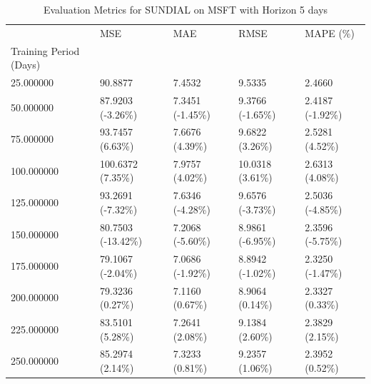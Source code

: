 \begin{table}
\caption{Evaluation Metrics for SUNDIAL on MSFT with Horizon 5 days}
\label{tab:sundial_MSFT_h5_metrics}
\begin{tabular}{lllll}
\toprule
 & MSE & MAE & RMSE & MAPE (\%) \\
Training Period (Days) &  &  &  &  \\
\midrule
25.000000 & 90.8877 & 7.4532 & 9.5335 & 2.4660 \\
50.000000 & 87.9203 (-3.26\%) & 7.3451 (-1.45\%) & 9.3766 (-1.65\%) & 2.4187 (-1.92\%) \\
75.000000 & 93.7457 (6.63\%) & 7.6676 (4.39\%) & 9.6822 (3.26\%) & 2.5281 (4.52\%) \\
100.000000 & 100.6372 (7.35\%) & 7.9757 (4.02\%) & 10.0318 (3.61\%) & 2.6313 (4.08\%) \\
125.000000 & 93.2691 (-7.32\%) & 7.6346 (-4.28\%) & 9.6576 (-3.73\%) & 2.5036 (-4.85\%) \\
150.000000 & 80.7503 (-13.42\%) & 7.2068 (-5.60\%) & 8.9861 (-6.95\%) & 2.3596 (-5.75\%) \\
175.000000 & 79.1067 (-2.04\%) & 7.0686 (-1.92\%) & 8.8942 (-1.02\%) & 2.3250 (-1.47\%) \\
200.000000 & 79.3236 (0.27\%) & 7.1160 (0.67\%) & 8.9064 (0.14\%) & 2.3327 (0.33\%) \\
225.000000 & 83.5101 (5.28\%) & 7.2641 (2.08\%) & 9.1384 (2.60\%) & 2.3829 (2.15\%) \\
250.000000 & 85.2974 (2.14\%) & 7.3233 (0.81\%) & 9.2357 (1.06\%) & 2.3952 (0.52\%) \\
\bottomrule
\end{tabular}
\end{table}
